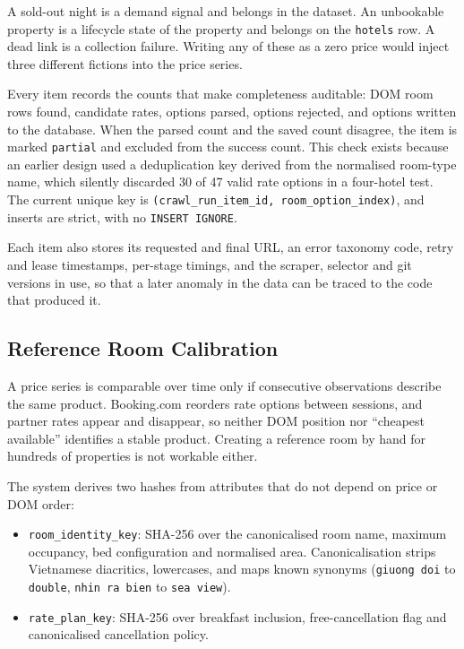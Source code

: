 A sold-out night is a demand signal and belongs in the dataset. An unbookable property is a lifecycle state of the property and belongs on the \texttt{hotels} row. A dead link is a collection failure. Writing any of these as a zero price would inject three different fictions into the price series.

Every item records the counts that make completeness auditable: DOM room rows found, candidate rates, options parsed, options rejected, and options written to the database. When the parsed count and the saved count disagree, the item is marked \texttt{partial} and excluded from the success count. This check exists because an earlier design used a deduplication key derived from the normalised room-type name, which silently discarded 30 of 47 valid rate options in a four-hotel test. The current unique key is \texttt{(crawl\_run\_item\_id, room\_option\_index)}, and inserts are strict, with no \texttt{INSERT IGNORE}.

Each item also stores its requested and final URL, an error taxonomy code, retry and lease timestamps, per-stage timings, and the scraper, selector and git versions in use, so that a later anomaly in the data can be traced to the code that produced it.

\subsection{Reference Room Calibration}
\label{sec:reference}

A price series is comparable over time only if consecutive observations describe the same product. Booking.com reorders rate options between sessions, and partner rates appear and disappear, so neither DOM position nor ``cheapest available'' identifies a stable product. Creating a reference room by hand for hundreds of properties is not workable either.

The system derives two hashes from attributes that do not depend on price or DOM order:

\begin{itemize}[leftmargin=*]
    \item \texttt{room\_identity\_key}: SHA-256 over the canonicalised room name, maximum occupancy, bed configuration and normalised area. Canonicalisation strips Vietnamese diacritics, lowercases, and maps known synonyms (\texttt{giuong doi} to \texttt{double}, \texttt{nhin ra bien} to \texttt{sea view}).
    \item \texttt{rate\_plan\_key}: SHA-256 over breakfast inclusion, free-cancellation flag and canonicalised cancellation policy.
\end{itemize}

